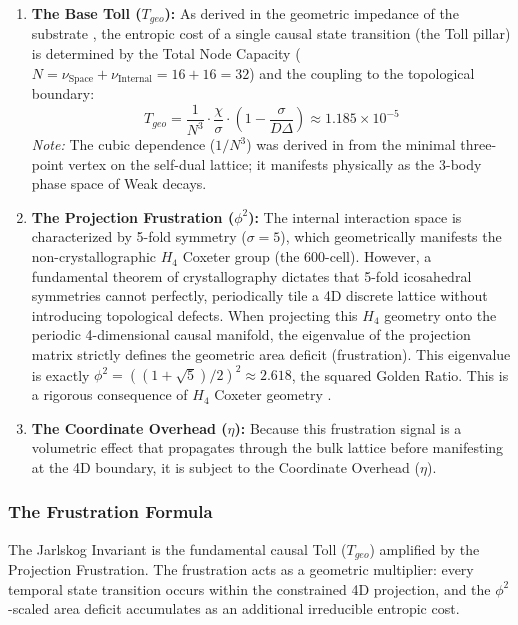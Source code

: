 \begin{enumerate}
    \item \textbf{The Base Toll ($T_{geo}$):} As derived in the geometric impedance of the substrate \cite{meyer_informational_2026}, the entropic cost of a single causal state transition (the Toll pillar) is determined by the Total Node Capacity ($N = \nu_{\text{Space}} + \nu_{\text{Internal}} = 16 + 16 = 32$) and the coupling to the topological boundary:
    \begin{equation}
        T_{geo} = \frac{1}{N^3} \cdot \frac{\chi}{\sigma} \cdot \left(1 - \frac{\sigma}{D\Delta}\right) \approx 1.185 \times 10^{-5}
    \end{equation}
    \textit{Note:} The cubic dependence ($1/N^3$) was derived in \cite{meyer_informational_2026} from the minimal three-point vertex on the self-dual lattice; it manifests physically as the 3-body phase space of Weak decays.
    
    \item \textbf{The Projection Frustration ($\phi^2$):} The internal interaction space is characterized by 5-fold symmetry ($\sigma=5$), which geometrically manifests the non-crystallographic $H_4$ Coxeter group (the 600-cell). However, a fundamental theorem of crystallography dictates that 5-fold icosahedral symmetries cannot perfectly, periodically tile a 4D discrete lattice without introducing topological defects. When projecting this $H_4$ geometry onto the periodic 4-dimensional causal manifold, the eigenvalue of the projection matrix strictly defines the geometric area deficit (frustration). This eigenvalue is exactly $\phi^2 = ((1+\sqrt{5})/2)^2 \approx 2.618$, the squared Golden Ratio. This is a rigorous consequence of $H_4$ Coxeter geometry \cite{moody_quasicrystals_1993}.
    
    \item \textbf{The Coordinate Overhead ($\eta$):} Because this frustration signal is a volumetric effect that propagates through the bulk lattice before manifesting at the 4D boundary, it is subject to the Coordinate Overhead ($\eta$).
\end{enumerate}

\subsubsection{The Frustration Formula}
The Jarlskog Invariant is the fundamental causal Toll ($T_{geo}$) amplified by the Projection Frustration. The frustration acts as a geometric multiplier: every temporal state transition occurs within the constrained 4D projection, and the $\phi^2$-scaled area deficit accumulates as an additional irreducible entropic cost.

